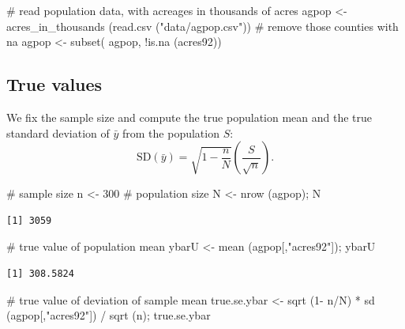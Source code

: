 \documentclass[
  letterpaper,
  DIV=11,
  numbers=noendperiod]{scrreprt}
\newenvironment{Shaded}{\begin{snugshade}}{\end{snugshade}}
\newcommand{\CommentTok}[1]{\textcolor[rgb]{0.37,0.37,0.37}{#1}}
\newcommand{\DecValTok}[1]{\textcolor[rgb]{0.68,0.00,0.00}{#1}}
\newcommand{\FunctionTok}[1]{\textcolor[rgb]{0.28,0.35,0.67}{#1}}
\newcommand{\NormalTok}[1]{\textcolor[rgb]{0.00,0.23,0.31}{#1}}
\newcommand{\OtherTok}[1]{\textcolor[rgb]{0.00,0.23,0.31}{#1}}
\newcommand{\SpecialCharTok}[1]{\textcolor[rgb]{0.37,0.37,0.37}{#1}}
\newcommand{\StringTok}[1]{\textcolor[rgb]{0.13,0.47,0.30}{#1}}
\renewcommand{\[}{\begin{equation}}
\renewcommand{\]}{\end{equation}}
\begin{document}
\begin{Shaded}
\begin{Highlighting}[]
\CommentTok{\# read population data, with acreages in thousands of acres}
\NormalTok{agpop }\OtherTok{\textless{}{-}} \FunctionTok{acres\_in\_thousands}\NormalTok{ (}\FunctionTok{read.csv}\NormalTok{ (}\StringTok{"data/agpop.csv"}\NormalTok{))}
\CommentTok{\# remove those counties with na}
\NormalTok{agpop }\OtherTok{\textless{}{-}} \FunctionTok{subset}\NormalTok{( agpop, }\SpecialCharTok{!}\FunctionTok{is.na}\NormalTok{ (acres92))}
\end{Highlighting}
\end{Shaded}

\subsection{True values}\label{true-values}

We fix the sample size and compute the true population mean and the true
standard deviation of \(\bar y\) from the population \(S\): \[
\mathrm{SD}(\bar{y}) = \sqrt{1 - \frac{n}{N}} \left(\frac{S}{\sqrt{n}}\right).
\]

\begin{Shaded}
\begin{Highlighting}[]
\CommentTok{\# sample size}
\NormalTok{n }\OtherTok{\textless{}{-}} \DecValTok{300}
\CommentTok{\# population size}
\NormalTok{N }\OtherTok{\textless{}{-}} \FunctionTok{nrow}\NormalTok{ (agpop); N}
\end{Highlighting}
\end{Shaded}

\begin{verbatim}
[1] 3059
\end{verbatim}

\begin{Shaded}
\begin{Highlighting}[]
\CommentTok{\# true value of population mean}
\NormalTok{ybarU }\OtherTok{\textless{}{-}} \FunctionTok{mean}\NormalTok{ (agpop[,}\StringTok{"acres92"}\NormalTok{]); ybarU}
\end{Highlighting}
\end{Shaded}

\begin{verbatim}
[1] 308.5824
\end{verbatim}

\begin{Shaded}
\begin{Highlighting}[]
\CommentTok{\# true value of deviation of sample mean}
\NormalTok{true.se.ybar }\OtherTok{\textless{}{-}} \FunctionTok{sqrt}\NormalTok{ (}\DecValTok{1}\SpecialCharTok{{-}}\NormalTok{ n}\SpecialCharTok{/}\NormalTok{N) }\SpecialCharTok{*} \FunctionTok{sd}\NormalTok{ (agpop[,}\StringTok{"acres92"}\NormalTok{]) }\SpecialCharTok{/} \FunctionTok{sqrt}\NormalTok{ (n); true.se.ybar}
\end{Highlighting}
\end{Shaded}
\end{document}
